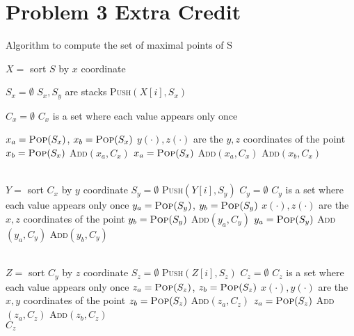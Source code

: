 \documentclass{article}
\begin{document}
\section*{Problem 3 Extra Credit}
\begin{algorithm}[H]
\caption{Algorithm to compute the set of maximal points of S}
\begin{algorithmic}[1]
\State $X=$ sort $S$ by $x$ coordinate

\State $S_x=\emptyset$
	\Comment $S_x, S_y$ are stacks
	\State \textsc{Push}$(X[i],S_x)$
\EndFor

\State $C_x=\emptyset$
	\Comment $C_x$ is a set where each value appears only once

	\State $x_a=\textsc{Pop}(S_x)$, $x_b=\textsc{Pop}(S_x)$
		 \Comment $y(\cdot),z(\cdot)$ are the $y,z$ coordinates of the point
			\State $x_b=\textsc{Pop}(S_x)$
		\Else
			\State \textsc{Add}$(x_a, C_x)$
			\State $x_a=\textsc{Pop}(S_x)$
		\EndIf
	\EndWhile
	\State \textsc{Add}$(x_a, C_x)$
		\State \textsc{Add}$(x_b, C_x)$
	\EndIf
	
	
\\
\State $Y=$ sort $C_x$ by $y$ coordinate
\State $S_y = \emptyset$
	\State \textsc{Push}$(Y[i],S_y)$
\EndFor
\State $C_y=\emptyset$ \Comment $C_y$ is a set where each value appears only once
	\State $y_a=\textsc{Pop}(S_y)$, $y_b=\textsc{Pop}(S_y)$
		 \Comment $x(\cdot),z(\cdot)$ are the $x,z$ coordinates of the point
			\State $y_b=\textsc{Pop}(S_y)$
		\Else
			\State \textsc{Add}$(y_a, C_y)$
			\State $y_a=\textsc{Pop}(S_y)$
		\EndIf
	\EndWhile
	\State \textsc{Add}$(y_a, C_y)$
		\State \textsc{Add}$(y_b, C_y)$
	\EndIf

\\
\State $Z=$ sort $C_y$ by $z$ coordinate
\State $S_z = \emptyset$
	\State \textsc{Push}$(Z[i],S_z)$
\EndFor
\State $C_z=\emptyset$ \Comment $C_z$ is a set where each value appears only once
	\State $z_a=\textsc{Pop}(S_z)$, $z_b=\textsc{Pop}(S_z)$
		 \Comment $x(\cdot), y(\cdot)$ are the $x,y$ coordinates of the point
			\State $z_b=\textsc{Pop}(S_z)$
		\Else
			\State \textsc{Add}$(z_a, C_z)$
			\State $z_a=\textsc{Pop}(S_z)$
		\EndIf
	\EndWhile
	\State \textsc{Add}$(z_a, C_z)$
		\State \textsc{Add}$(z_b, C_z)$
	\EndIf
\\
\State \Return $C_z$



\EndFunction
\end{algorithmic}
\end{algorithm}
\end{document}
